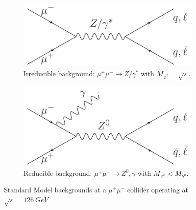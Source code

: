 \documentclass[a4paper]{article}
\begin{document}
\begin{figure}[h]
	\centering
	\begin{subfigure}[b]{0.4\textwidth}
		\centering
		\includegraphics[width=\textwidth]{mumu-zstar-ql}
		\caption{Irreducible background: $\mu^+\mu^-\rightarrow Z/\gamma^*$ with $M_{Z^*} = \sqrt{s}$.}
\label{fig:mumu-zstar-ql}
	\end{subfigure}
	\qquad
	\begin{subfigure}[b]{0.4\textwidth}
		\centering
		\includegraphics[width=\textwidth]{mumu-zg-ql}
		\caption{Reducible background: $\mu^+\mu^-\rightarrow Z^0,\gamma$ with $M_{Z^0} < M_{h^0}$.}
\label{fig:mumu-zg-ql}
	\end{subfigure}
	\caption{Standard Model backgrounds at a $\mu^+\mu^-$ collider operating at $\sqrt{s}=126\ GeV$}
\label{sm-bkg-feyn}
\end{figure}
\end{document}

